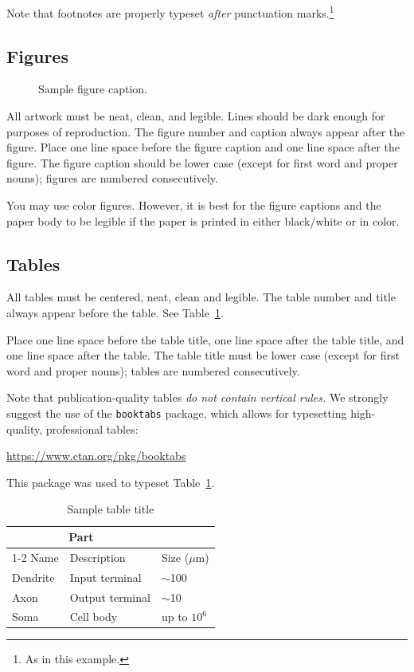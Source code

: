 \documentclass{article}
\begin{document}
Note that footnotes are properly typeset \emph{after} punctuation marks.\footnote{As in this example.}

\subsection{Figures}

\begin{figure}
  \centering
  \fbox{\rule[-.5cm]{0cm}{4cm} \rule[-.5cm]{4cm}{0cm}}
  \caption{Sample figure caption.}
\end{figure}

All artwork must be neat, clean, and legible. Lines should be dark enough for purposes of reproduction. The figure number and caption always appear after the figure. Place one line space before the figure caption and one line space after the figure. The figure caption should be lower case (except for first word and proper nouns); figures are numbered consecutively.

You may use color figures.  However, it is best for the figure captions and the paper body to be legible if the paper is printed in either black/white or in color.

\subsection{Tables}

All tables must be centered, neat, clean and legible.  The table number and title always appear before the table.  See Table~\ref{sample-table}.

Place one line space before the table title, one line space after the table title, and one line space after the table. The table title must be lower case (except for first word and proper nouns); tables are
numbered consecutively.

Note that publication-quality tables \emph{do not contain vertical rules.} We strongly suggest the use of the \verb+booktabs+ package, which allows for typesetting high-quality, professional tables:
\begin{center}
  \url{https://www.ctan.org/pkg/booktabs}
\end{center}
This package was used to typeset Table~\ref{sample-table}.

\begin{table}
  \caption{Sample table title}
  \label{sample-table}
  \centering
  \begin{tabular}{lll}
    \toprule
    \multicolumn{2}{c}{Part}                   \\
    \cmidrule(r){1-2}
    Name     & Description     & Size ($\mu$m) \\
    \midrule
    Dendrite & Input terminal  & $\sim$100     \\
    Axon     & Output terminal & $\sim$10      \\
    Soma     & Cell body       & up to $10^6$  \\
    \bottomrule
  \end{tabular}
\end{table}
\end{document}
